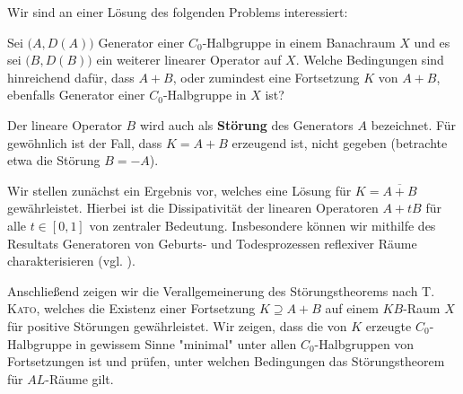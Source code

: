 


Wir sind an einer Lösung des folgenden Problems interessiert:
\begin{prob*} Sei $\big(A, D(A)\big)$ Generator einer $C_0$-Halbgruppe in einem Banachraum $X$ und es sei $\big(B, D(B)\big)$ ein weiterer linearer Operator auf $X$. Welche Bedingungen sind hinreichend dafür, dass $A+B$, oder zumindest eine Fortsetzung $K$ von $A+B$, ebenfalls Generator einer $C_0$-Halbgruppe in $X$ ist?
\end{prob*}
Der lineare Operator $B$ wird auch als \textbf{Störung} des Generators $A$ bezeichnet. Für gewöhnlich ist der Fall, dass $K=A+B$ erzeugend ist, nicht gegeben (betrachte etwa die Störung $B=-A$).
\par
Wir stellen zunächst ein Ergebnis vor, welches eine Lösung für $K=\overline{A+B}$ gewährleistet. Hierbei ist die Dissipativität der linearen Operatoren $A+tB$ für alle $t\in[0,1]$ von zentraler Bedeutung. Insbesondere können wir mithilfe des Resultats Generatoren von Geburts- und Todesprozessen reflexiver Räume charakterisieren (vgl. ).

\par Anschließend zeigen wir die Verallgemeinerung des Störungstheorems nach \textsc{T. Kato}, welches die Existenz einer Fortsetzung $K\supseteq A+B$ auf einem $KB$-Raum $X$ für positive Störungen gewährleistet. Wir zeigen, dass die von $K$ erzeugte $C_0$-Halbgruppe in gewissem Sinne "minimal"\; unter allen $C_0$-Halbgruppen von Fortsetzungen ist und prüfen, unter welchen Bedingungen das Störungstheorem für  $AL$-Räume gilt.



